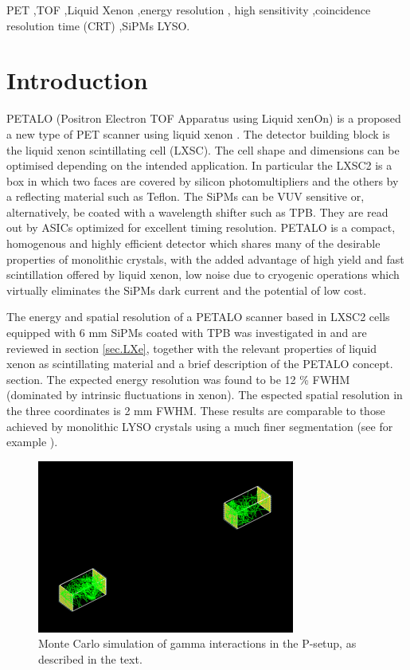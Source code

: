 \documentclass[review]{elsarticle}
\begin{document}
\begin{frontmatter}
\begin{keyword}
PET \sep TOF \sep Liquid Xenon \sep energy resolution \sep
 high sensitivity \sep coincidence resolution time (CRT) \sep SiPMs \sp LYSO.
\end{keyword}

\end{frontmatter}



\section{Introduction}

PETALO (Positron Electron TOF Apparatus using Liquid xenOn) is a proposed a new type of PET scanner using liquid xenon  \cite{Petalo2015}. The detector building block is the liquid xenon scintillating cell (LXSC). The cell shape and dimensions can be optimised depending on the intended application. In particular the LXSC2 is a box in which two faces are covered by silicon photomultipliers and the others by a reflecting material such as Teflon. The SiPMs can be VUV sensitive or, alternatively, be coated with a wavelength shifter such as TPB.  They are read out by ASICs optimized for excellent timing resolution. PETALO is a compact, homogenous and highly efficient detector which shares many of the desirable properties of monolithic crystals, with the added advantage of high yield and fast scintillation offered by liquid xenon, low noise due to cryogenic operations which virtually eliminates the SiPMs dark current and the potential of low cost. 

The energy and spatial resolution of a PETALO scanner based in LXSC2 cells equipped with 6 mm SiPMs coated with TPB was investigated in \cite{Petalo2015} and are reviewed in section \ref{sec.LXe}, together with the relevant properties of liquid xenon as scintillating material and a brief description of the PETALO concept. section. The expected energy resolution was found to be 12 \% FWHM (dominated by intrinsic fluctuations in xenon). The espected spatial resolution in the three coordinates is 2 mm FWHM. These results are  comparable to those achieved by monolithic LYSO crystals using a much finer segmentation 
(see for example \cite{VanDamm2011}). 

 \begin{figure}[!bthp]
	\centering
	\includegraphics[scale=0.5]{../img/PetaloSetup.png}
	\caption{\label{fig.psetup} Monte Carlo simulation of gamma interactions in the P-setup, as 
	described in the text.}
\end{figure}
\end{document}
